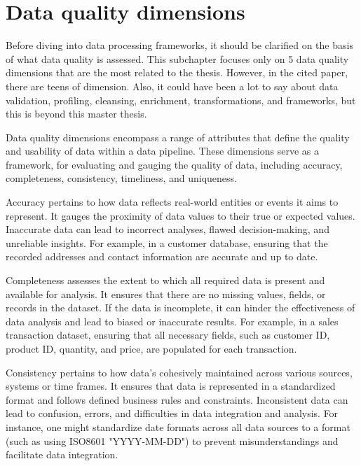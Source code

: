 \section{Data quality dimensions}

Before diving into data processing frameworks, it should be clarified on the basis of what data quality is assessed. This subchapter focuses only on 5 data quality dimensions that are the most related to the thesis. However, in the cited paper, there are teens of dimension. Also, it could have been a lot to say about data validation, profiling, cleansing, enrichment, transformations, and frameworks, but this is beyond this master thesis\footnotemark[19].

Data quality dimensions encompass a range of attributes that define the quality and usability of data within a data pipeline. These dimensions serve as a framework, for evaluating and gauging the quality of data, including accuracy, completeness, consistency, timeliness, and uniqueness\footnotemark[19].

Accuracy pertains to how data reflects real-world entities or events it aims to represent. It gauges the proximity of data values to their true or expected values. Inaccurate data can lead to incorrect analyses, flawed decision-making, and unreliable insights. For example, in a customer database, ensuring that the recorded addresses and contact information are accurate and up to date\footnotemark[19].

Completeness assesses the extent to which all required data is present and available for analysis. It ensures that there are no missing values, fields, or records in the dataset. If the data is incomplete, it can hinder the effectiveness of data analysis and lead to biased or inaccurate results. For example, in a sales transaction dataset, ensuring that all necessary fields, such as customer ID, product ID, quantity, and price, are populated for each transaction\footnotemark[19].

Consistency pertains to how data's cohesively maintained across various sources, systems or time frames. It ensures that data is represented in a standardized format and follows defined business rules and constraints. Inconsistent data can lead to confusion, errors, and difficulties in data integration and analysis. For instance, one might standardize date formats across all data sources to a format (such as using ISO8601 "YYYY-MM-DD") to prevent misunderstandings and facilitate data integration\footnotemark[19].

